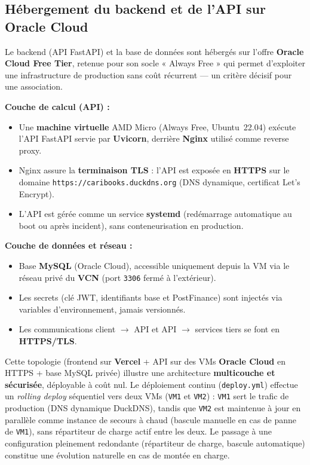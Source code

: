 \documentclass[12pt, a4paper]{report}
\renewcommand{\_}{\origunderscore\allowbreak}
\begin{document}
\subsection{Hébergement du backend et de l'API sur Oracle Cloud}

Le backend (API FastAPI) et la base de données sont hébergés sur l'offre \textbf{Oracle Cloud Free Tier}, retenue pour son socle « Always Free » qui permet d'exploiter une infrastructure de production sans coût récurrent — un critère décisif pour une association.

\vspace{4pt}
\noindent\textbf{Couche de calcul (API) :}
\begin{itemize}
    \item Une \textbf{machine virtuelle} AMD Micro (Always Free, Ubuntu~22.04) exécute l'API FastAPI servie par \textbf{Uvicorn}, derrière \textbf{Nginx} utilisé comme reverse proxy.
    \item Nginx assure la \textbf{terminaison TLS} : l'API est exposée en \textbf{HTTPS} sur le domaine \texttt{https://caribooks.duckdns.org} (DNS dynamique, certificat Let's Encrypt).
    \item L'API est gérée comme un service \textbf{systemd} (redémarrage automatique au boot ou après incident), sans conteneurisation en production.
\end{itemize}

\noindent\textbf{Couche de données et réseau :}
\begin{itemize}
    \item Base \textbf{MySQL} (Oracle Cloud), accessible uniquement depuis la VM via le réseau privé du \textbf{VCN} (port \texttt{3306} fermé à l'extérieur).
    \item Les secrets (clé JWT, identifiants base et PostFinance) sont injectés via variables d'environnement, jamais versionnés.
    \item Les communications client $\rightarrow$ API et API $\rightarrow$ services tiers se font en \textbf{HTTPS/TLS}.
\end{itemize}

\noindent Cette topologie (frontend sur \textbf{Vercel} + API sur des VMs \textbf{Oracle Cloud} en HTTPS + base MySQL privée) illustre une architecture \textbf{multicouche et sécurisée}, déployable à coût nul. Le déploiement continu (\texttt{deploy.yml}) effectue un \textit{rolling deploy} séquentiel vers deux VMs (\texttt{VM1} et \texttt{VM2}) : \texttt{VM1} sert le trafic de production (DNS dynamique DuckDNS), tandis que \texttt{VM2} est maintenue à jour en parallèle comme instance de secours à chaud (bascule manuelle en cas de panne de \texttt{VM1}), sans répartiteur de charge actif entre les deux. Le passage à une configuration pleinement redondante (répartiteur de charge, bascule automatique) constitue une évolution naturelle en cas de montée en charge.
\end{document}
